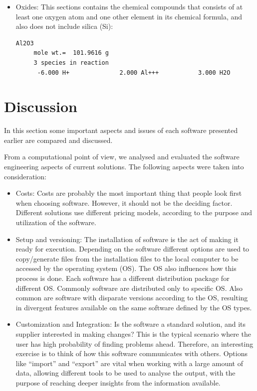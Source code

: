 \begin{enumerate}
\begin{itemize}
\item Oxides: This sections contains the chemical compounds that consists of at least one oxygen atom and one other element in its chemical formula, and also does not include silica (Si): 

\begin{minipage}[c]{0.92\textwidth}
\begin{lstlisting}[frame=single, caption=Excerpt of the section Oxides]
Al2O3
     mole wt.=  101.9616 g
     3 species in reaction
      -6.000 H+              2.000 Al+++           3.000 H2O
\end{lstlisting}
\end{minipage}
\end{itemize}

\section{Discussion}
In this section some important aspects and issues of each software presented earlier are compared and discussed. 


From a computational point of view, we analysed and evaluated the software engineering aspects of current solutions.  The following aspects were taken into consideration:
\begin{itemize}
\item Costs: Costs are probably the most important thing that people look first when choosing software. However, it should not be the deciding factor. Different solutions use different pricing models, according to the purpose and utilization of the software.

\item Setup and versioning: The installation of software is the act of making it ready for execution. Depending on the software different options are used to copy/generate files from the installation files to the local computer to be accessed by the operating system (OS). The OS also influences how this process is done. Each software has a different distribution package for different OS. Commonly software are distributed only to specific OS. Also common are software with disparate versions according to the OS, resulting in divergent features available on the same software defined by the OS types.

\item Customization and Integration: Is the software a standard solution, and its supplier interested in making changes? This is the typical scenario where the user has high probability of finding problems ahead. Therefore, an interesting exercise is to think of how this software communicates with others. Options like  ``import'' and ``export'' are vital when working with a large amount of data, allowing different tools to be used to analyse the output, with the purpose of reaching deeper insights from the information available. 


\end{itemize}
\end{enumerate}
